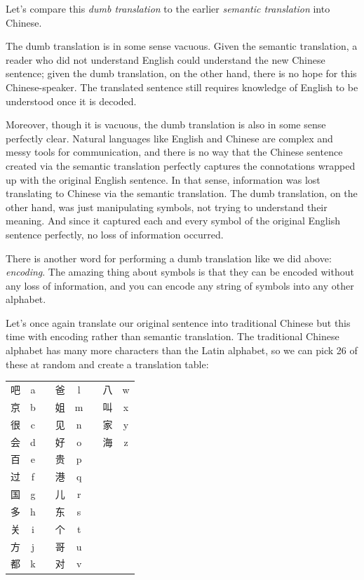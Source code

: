 \documentclass[UTF8]{book}
\begin{document}
\begin{CJK}{UTF8}{gbsn}
Let's compare this \emph{dumb translation} to the earlier \emph{semantic translation} into Chinese.

The dumb translation is in some sense vacuous. Given the semantic translation, a reader who did not understand English could understand the new Chinese sentence; given the dumb translation, on the other hand, there is no hope for this Chinese-speaker. The translated sentence still requires knowledge of English to be understood once it is decoded.

Moreover, though it is vacuous, the dumb translation is also in some sense perfectly clear. Natural languages like English and Chinese are complex and messy tools for communication, and there is no way that the Chinese sentence created via the semantic translation perfectly captures the connotations wrapped up with the original English sentence. In that sense, information was lost translating to Chinese via the semantic translation. The dumb translation, on the other hand, was just manipulating symbols, not trying to understand their meaning. And since it captured each and every symbol of the original English sentence perfectly, no loss of information occurred.

There is another word for performing a dumb translation like we did above: \emph{encoding}. The amazing thing about symbols is that they can be encoded without any loss of information, and you can encode any string of symbols into any other alphabet.

Let's once again translate our original sentence into traditional Chinese but this time with encoding rather than semantic translation. The traditional Chinese alphabet has many more characters than the Latin alphabet, so we can pick 26 of these at random and create a translation table:

\begin{center}
\begin{tabular}{ cccccccc }
 吧 & a & & 爸 & l & & 八 & w \\
 京 & b & & 姐 & m & & 叫 & x \\
 很 & c & & 见 & n & & 家 & y \\
 会 & d & & 好 & o & & 海 & z \\
 百 & e & & 贵 & p & & \\
 过 & f & & 港 & q & & \\
 国 & g & & 儿 & r & & \\
 多 & h & & 东 & s & & \\
 关 & i & & 个 & t & & \\
 方 & j & & 哥 & u & & \\
 都 & k & & 对 & v & & \\
\end{tabular}
\end{center}


\end{CJK}
\end{document}
